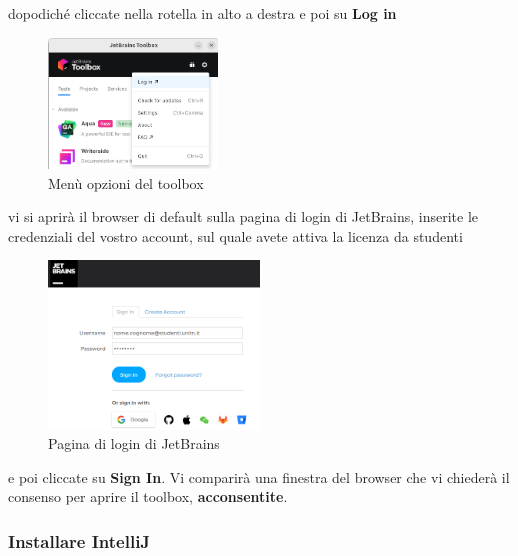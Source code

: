             dopodiché cliccate nella rotella in alto a destra e poi su \textbf{Log in}
            \begin{figure}[H]
                \centering
                \graphicspath{{src/capitoli/04/img/}}
                \includegraphics[width=0.4\textwidth]{toolbox-login.png}
                \caption{Menù opzioni del toolbox}
                \label{fig:Menù opzioni del toolbox}
            \end{figure}
            vi si aprirà il browser di default sulla pagina di login di JetBrains, inserite le credenziali del vostro account, sul quale avete 
            attiva la licenza da studenti
            \begin{figure}[H]
                \centering
                \graphicspath{{src/capitoli/04/img/}}
                \includegraphics[width=0.5\textwidth]{toolbox-login-web.png}
                \caption{Pagina di login di JetBrains}
                \label{fig:Pagina di login di JetBrains}
            \end{figure}
        
            e poi cliccate su \textbf{Sign In}. Vi comparirà una finestra del browser che vi chiederà il consenso per aprire il toolbox, \textbf{acconsentite}. 
        
        \subsubsection{Installare IntelliJ}

